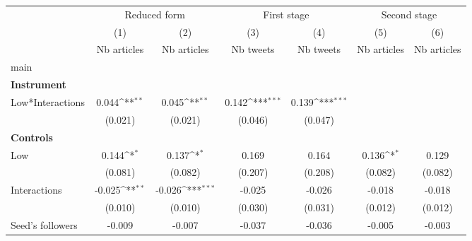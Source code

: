 {
\def\sym#1{\ifmmode^{#1}\else\(^{#1}\)\fi}
\begin{tabular}{l*{6}{c}}
\hline\hline
                    &\multicolumn{2}{c}{Reduced form}           &\multicolumn{2}{c}{First stage}            &\multicolumn{2}{c}{Second stage}           \\\cmidrule(lr){2-3}\cmidrule(lr){4-5}\cmidrule(lr){6-7}
                    &\multicolumn{1}{c}{(1)}&\multicolumn{1}{c}{(2)}&\multicolumn{1}{c}{(3)}&\multicolumn{1}{c}{(4)}&\multicolumn{1}{c}{(5)}&\multicolumn{1}{c}{(6)}\\
                    &\multicolumn{1}{c}{Nb articles}&\multicolumn{1}{c}{Nb articles}&\multicolumn{1}{c}{Nb tweets}&\multicolumn{1}{c}{Nb tweets}&\multicolumn{1}{c}{Nb articles}&\multicolumn{1}{c}{Nb articles}\\
\hline
main                &                     &                     &                     &                     &                     &                     \\
\textbf{Instrument} &                     &                     &                     &                     &                     &                     \\
Low*Interactions    &       0.044\sym{**} &       0.045\sym{**} &       0.142\sym{***}&       0.139\sym{***}&                     &                     \\
                    &     (0.021)         &     (0.021)         &     (0.046)         &     (0.047)         &                     &                     \\
\textbf{Controls}   &                     &                     &                     &                     &                     &                     \\
Low                 &       0.144\sym{*}  &       0.137\sym{*}  &       0.169         &       0.164         &       0.136\sym{*}  &       0.129         \\
                    &     (0.081)         &     (0.082)         &     (0.207)         &     (0.208)         &     (0.082)         &     (0.082)         \\
Interactions        &      -0.025\sym{**} &      -0.026\sym{***}&      -0.025         &      -0.026         &      -0.018         &      -0.018         \\
                    &     (0.010)         &     (0.010)         &     (0.030)         &     (0.031)         &     (0.012)         &     (0.012)         \\
Seed’s followers    &      -0.009         &      -0.007         &      -0.037         &      -0.036         &      -0.005         &      -0.003         \\

\end{tabular}}
